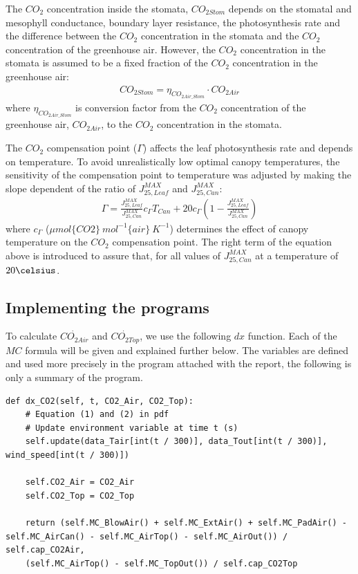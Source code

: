 \documentclass[a4paper]{article}
\numberwithin{equation}{section}
\begin{document}
The \(CO_2\) concentration inside the stomata, \(CO_{2Stom}\) depends on the stomatal and mesophyll conductance, boundary layer resistance, the photosynthesis rate and the difference between the \(CO_2\) concentration in the stomata and the \(CO_2\) concentration of the greenhouse air. However, the \(CO_2\) concentration in the stomata is assumed to be a fixed fraction of the \(CO_2\) concentration in the greenhouse air:
\begin{align}
  CO_{2Stom} = \eta_{CO_{2Air\_Stom}} \cdot CO_{2Air}
\end{align}
where \(\eta_{CO_{2Air\_Stom}}\) is conversion factor from the \(CO_2\) concentration of the greenhouse air, \(CO_{2Air}\), to the \(CO_2\) concentration in the stomata.

The \(CO_2\) compensation point (\(\Gamma\)) affects the leaf photosynthesis rate and depends on temperature. To avoid unrealistically low optimal canopy temperatures, the sensitivity of the compensation point to temperature was adjusted by making the slope dependent of the ratio of \(J^{MAX}_{25,Leaf}\) and \(J^{MAX}_{25,Can}\):
\begin{align}
  \Gamma = \frac{J^{MAX}_{25,Leaf}}{J^{MAX}_{25,Can}}c_{\Gamma} T_{Can} + 20 c_{\Gamma} \left(1-\frac{J^{MAX}_{25,Leaf}}{J^{MAX}_{25,Can}}\right)
\end{align}
where \(c_{\Gamma}\) (\(\mu mol\{CO2\}\ mol^{-1}\{air\}\ K^{-1}\)) determines the effect of canopy temperature on the \(CO_2\) compensation point. The right term of the equation above is introduced to assure that, for all values of \(J^{MAX}_{25,Can}\) at a temperature of \(20 \celsius\).

\newpage
\subsection{Implementing the programs}
To calculate \(\dot{CO_{2 Air}}\) and \(\dot{CO_{2 Top}}\), we use the following \(dx\) function. Each of the \(MC\) formula will be given and explained further below. The variables are defined and used more precisely in the program attached with the report, the following is only a summary of the program.

\begin{mdframed}[leftline=false,rightline=false,backgroundcolor=magenta!10,nobreak=true]
  \begin{verbatim}
def dx_CO2(self, t, CO2_Air, CO2_Top):
    # Equation (1) and (2) in pdf
    # Update environment variable at time t (s)
    self.update(data_Tair[int(t / 300)], data_Tout[int(t / 300)], wind_speed[int(t / 300)])

    self.CO2_Air = CO2_Air
    self.CO2_Top = CO2_Top

    return (self.MC_BlowAir() + self.MC_ExtAir() + self.MC_PadAir() - self.MC_AirCan() - self.MC_AirTop() - self.MC_AirOut()) / self.cap_CO2Air, 
    (self.MC_AirTop() - self.MC_TopOut()) / self.cap_CO2Top
  \end{verbatim}
\end{mdframed}
\end{document}
